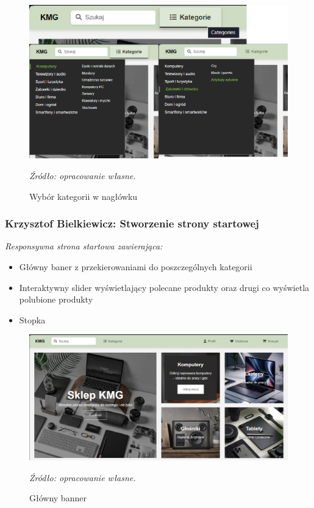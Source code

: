 \documentclass[12pt,a4paper,oneside]{article}
\theoremstyle{definition}
\numberwithin{equation}{section}
\begin{document}
\begin{figure}[H]
    \centering
    \includegraphics[width=0.9\columnwidth]{images/krzysztofBImages/header-categories.png}
    \caption{Wybór kategorii w nagłówku}
    \emph{Źródło: opracowanie własne.}
    \label{header-categories}
\end{figure}


\subsubsection{Krzysztof Bielkiewicz: Stworzenie strony startowej}
\label{1.3.2}
\textit{Responsywna strona startowa zawierająca:}
    \begin{itemize}
        \item Główny baner z przekierowaniami do poszczególnych kategorii
        \item Interaktywny slider wyświetlający polecane produkty oraz drugi co wyświetla polubione produkty
        \item Stopka
    \end{itemize}

    \begin{figure}[H]
        \centering
        \includegraphics[width=0.8\columnwidth]{images/krzysztofBImages/main-banner.png}
        \caption{Główny banner}
        \emph{Źródło: opracowanie własne.}
    \end{figure}
\end{document}
